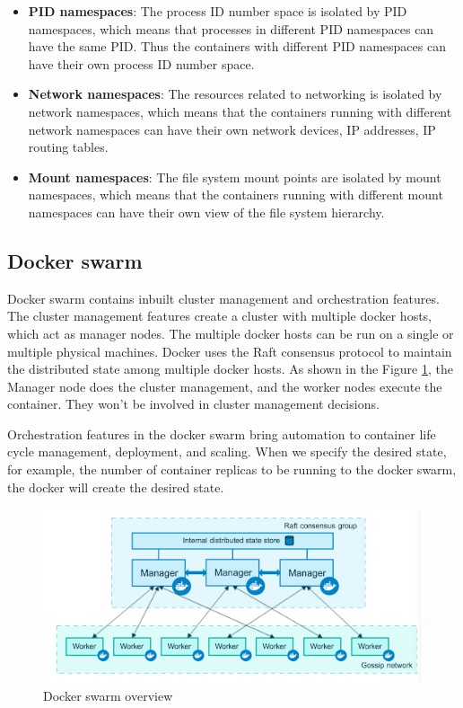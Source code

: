 \documentclass{iitbreport}
\begin{document}
\begin{itemize}
    \item {\textbf{PID namespaces}}: The process ID number space is isolated by PID namespaces, which means that processes in different PID namespaces can have the same PID. Thus the containers with different PID namespaces can have their own process ID number space.
    \item {\textbf{Network namespaces}}: The resources related to networking is  isolated by network namespaces, which means that the containers running with different network namespaces can have their own network devices, IP addresses, IP routing tables.
    \item {\textbf{Mount namespaces}}: The file system mount points are  isolated by mount namespaces, which means that the containers running with different mount namespaces can have their own view of the file system hierarchy.
    
\end{itemize}


\subsection{Docker swarm}
Docker swarm \cite{docker_swarm} contains inbuilt cluster management and orchestration features. The cluster management features create a cluster with multiple docker hosts, which act as manager nodes. The multiple docker hosts can be run on a single or multiple physical machines. Docker uses the Raft consensus protocol to maintain the distributed state among multiple docker hosts. As shown in the Figure \ref{fig:docker_swarm}, the Manager node does the cluster management, and the worker nodes execute the container. They won't be involved in cluster management decisions.


Orchestration features in the docker swarm bring automation to container life cycle management, deployment, and scaling. When we specify the desired state, for example, the number of container replicas to be running to the docker swarm, the docker will create the desired state.
\begin{figure}[!htb]
            \centering
            \includegraphics[width=\linewidth]{Images/Docker_swarm.png}
            \caption{Docker swarm  overview \cite{docker_swarm_overview}}
            \label{fig:docker_swarm}
\end{figure}
\end{document}
